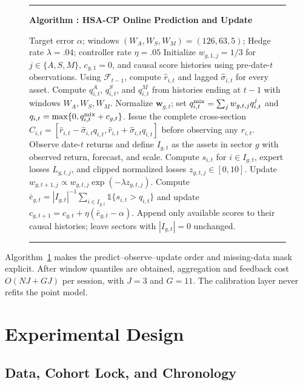 \documentclass[conference]{IEEEtran}
\newcounter{algorithm}
\newcommand{\algcaption}[1]{%
  \refstepcounter{algorithm}\noindent\textbf{Algorithm \thealgorithm: #1}\par\smallskip}
\begin{document}
\begin{figure}[t]
\small
\hrule\vspace{3pt}
\algcaption{HSA-CP Online Prediction and Update}\label{alg:hsa}
\begin{algorithmic}[1]
\REQUIRE Target error $\alpha$; windows $(W_A,W_S,W_M)=(126,63,5)$; Hedge rate $\lambda=.04$; controller rate $\eta=.05$
\STATE Initialize $w_{g,1,j}=1/3$ for $j\in\{A,S,M\}$, $c_{g,1}=0$, and causal score histories using pre-date-$t$ observations.
  \STATE Using $\mathcal F_{t-1}$, compute $\widehat r_{i,t}$ and lagged $\widehat\sigma_{i,t}$ for every asset.
  \STATE Compute $q^A_{i,t}$, $q^S_{i,t}$, and $q^M_{i,t}$ from histories ending at $t-1$ with windows $W_A,W_S,W_M$.
    \STATE Normalize $\mathbf w_{g,t}$; set $q^{\rm mix}_{i,t}=\sum_jw_{g,t,j}q^j_{i,t}$ and $q_{i,t}=\max\{0,q^{\rm mix}_{i,t}+c_{g,t}\}$.
  \ENDFOR
  \STATE Issue the complete cross-section $C_{i,t}=[\widehat r_{i,t}-\widehat\sigma_{i,t}q_{i,t},\widehat r_{i,t}+\widehat\sigma_{i,t}q_{i,t}]$ before observing any $r_{i,t}$.
  \STATE Observe date-$t$ returns and define $I_{g,t}$ as the assets in sector $g$ with observed return, forecast, and scale.
    \STATE Compute $s_{i,t}$ for $i\in I_{g,t}$, expert losses $L_{g,t,j}$, and clipped normalized losses $z_{g,t,j}\in[0,10]$.
    \STATE Update $w_{g,t+1,j}\propto w_{g,t,j}\exp(-\lambda z_{g,t,j})$.
    \STATE Compute $\bar e_{g,t}=|I_{g,t}|^{-1}\sum_{i\in I_{g,t}}\mathbb 1\{s_{i,t}>q_{i,t}\}$ and update $c_{g,t+1}=c_{g,t}+\eta(\bar e_{g,t}-\alpha)$.
  \ENDFOR
  \STATE Append only available scores to their causal histories; leave sectors with $|I_{g,t}|=0$ unchanged.
\ENDFOR
\end{algorithmic}
\vspace{2pt}\hrule
\end{figure}

Algorithm~\ref{alg:hsa} makes the predict--observe--update order and missing-data mask explicit. After window quantiles are obtained, aggregation and feedback cost $O(NJ+GJ)$ per session, with $J=3$ and $G=11$. The calibration layer never refits the point model.

\section{Experimental Design}

\subsection{Data, Cohort Lock, and Chronology}
\end{document}
